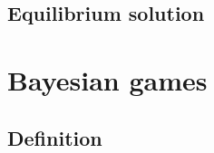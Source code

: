 \documentclass{beamer}
\begin{document}
\begin{frame}{}

\end{frame}

\subsection{Equilibrium solution}

\begin{frame}{}

\end{frame}

\begin{frame}{}

\end{frame}

\begin{frame}{}

\end{frame}

\begin{frame}{}

\end{frame}

\begin{frame}{}

\end{frame}

\begin{frame}{}

\end{frame}

\section{Bayesian games}

\subsection{Definition}

\begin{frame}{}

\end{frame}

\begin{frame}{}

\end{frame}

\begin{frame}{}

\end{frame}

\begin{frame}{}

\end{frame}
\end{document}
